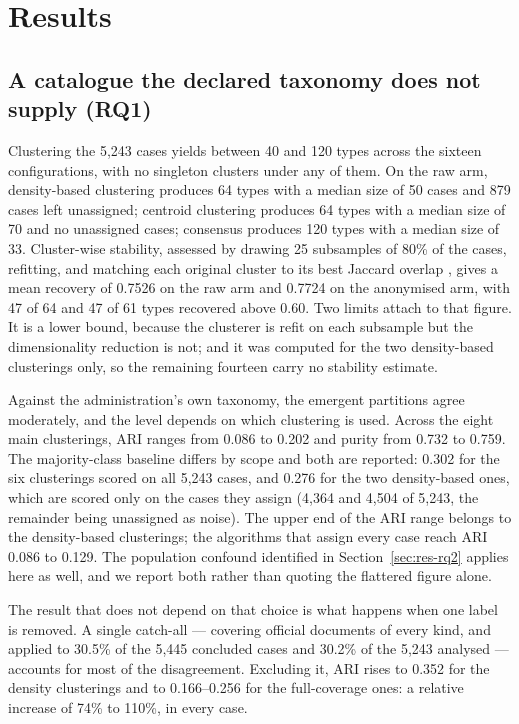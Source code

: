 \section{Results}\label{sec:results}

\subsection{A catalogue the declared taxonomy does not supply (RQ1)}\label{sec:res-rq1}

Clustering the 5{,}243 cases yields between 40 and 120 types across the sixteen configurations,
with no singleton clusters under any of them. On the raw arm, density-based clustering produces
64 types with a median size of 50 cases and 879 cases left unassigned; centroid clustering
produces 64 types with a median size of 70 and no unassigned cases; consensus produces 120 types
with a median size of 33. Cluster-wise stability, assessed by drawing 25 subsamples of 80\% of
the cases, refitting, and matching each original cluster to its best Jaccard overlap
\citep{hennig2007stability}, gives a mean recovery of 0.7526 on the raw arm and 0.7724 on the
anonymised arm, with 47 of 64 and 47 of 61 types recovered above 0.60. Two limits attach to that
figure. It is a lower bound, because the clusterer is refit on each subsample but the
dimensionality reduction is not; and it was computed for the two density-based clusterings only,
so the remaining fourteen carry no stability estimate.

Against the administration's own taxonomy, the emergent partitions agree moderately, and the
level depends on which clustering is used. Across the eight main clusterings, ARI ranges from
0.086 to 0.202 and purity from 0.732 to 0.759. The majority-class baseline differs by scope and
both are reported: 0.302 for the six clusterings scored on all 5{,}243 cases, and 0.276 for the
two density-based ones, which are scored only on the cases they assign (4{,}364 and 4{,}504 of
5{,}243, the remainder being unassigned as noise). The upper end of the ARI range belongs to the
density-based clusterings; the algorithms that assign every case reach ARI 0.086 to 0.129. The
population confound identified in Section~\ref{sec:res-rq2} applies here as well, and we report
both rather than quoting the flattered figure alone.

The result that does not depend on that choice is what happens when one label is removed. A
single catch-all --- covering official documents of every kind, and applied to 30.5\% of the
5{,}445 concluded cases and 30.2\% of the 5{,}243 analysed --- accounts for most of the
disagreement. Excluding it, ARI rises to 0.352 for the density clusterings and to 0.166--0.256
for the full-coverage ones: a relative increase of 74\% to 110\%, in every case.

